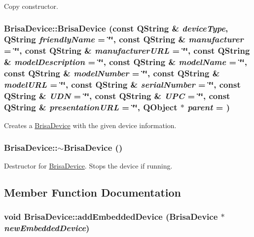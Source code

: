 Copy constructor. \hypertarget{classBrisaUpnp_1_1BrisaDevice_ab84c880091eb451d28ae025082687dca}{
\subsubsection[{BrisaDevice}]{\setlength{\rightskip}{0pt plus 5cm}BrisaDevice::BrisaDevice (const QString \& {\em deviceType}, \/  QString {\em friendlyName} = {\ttfamily \char`\"{}\char`\"{}}, \/  const QString \& {\em manufacturer} = {\ttfamily \char`\"{}\char`\"{}}, \/  const QString \& {\em manufacturerURL} = {\ttfamily \char`\"{}\char`\"{}}, \/  const QString \& {\em modelDescription} = {\ttfamily \char`\"{}\char`\"{}}, \/  const QString \& {\em modelName} = {\ttfamily \char`\"{}\char`\"{}}, \/  const QString \& {\em modelNumber} = {\ttfamily \char`\"{}\char`\"{}}, \/  const QString \& {\em modelURL} = {\ttfamily \char`\"{}\char`\"{}}, \/  const QString \& {\em serialNumber} = {\ttfamily \char`\"{}\char`\"{}}, \/  const QString \& {\em UDN} = {\ttfamily \char`\"{}\char`\"{}}, \/  const QString \& {\em UPC} = {\ttfamily \char`\"{}\char`\"{}}, \/  const QString \& {\em presentationURL} = {\ttfamily \char`\"{}\char`\"{}}, \/  QObject $\ast$ {\em parent} = {})}}
\label{classBrisaUpnp_1_1BrisaDevice_ab84c880091eb451d28ae025082687dca}


Creates a \hyperlink{classBrisaUpnp_1_1BrisaDevice}{BrisaDevice} with the given device information. \hypertarget{classBrisaUpnp_1_1BrisaDevice_a335a9375c0ae31e3182284b89e093fba}{
\subsubsection[{$\sim$BrisaDevice}]{\setlength{\rightskip}{0pt plus 5cm}BrisaDevice::$\sim$BrisaDevice ()}}
\label{classBrisaUpnp_1_1BrisaDevice_a335a9375c0ae31e3182284b89e093fba}


Destructor for \hyperlink{classBrisaUpnp_1_1BrisaDevice}{BrisaDevice}. Stops the device if running. 

\subsection{Member Function Documentation}
\hypertarget{classBrisaUpnp_1_1BrisaDevice_abfdfabc11ad5c39300ea9967ed7122a8}{
\subsubsection[{addEmbeddedDevice}]{\setlength{\rightskip}{0pt plus 5cm}void BrisaDevice::addEmbeddedDevice ({\bf BrisaDevice} $\ast$ {\em newEmbeddedDevice})}}
\label{classBrisaUpnp_1_1BrisaDevice_abfdfabc11ad5c39300ea9967ed7122a8}


